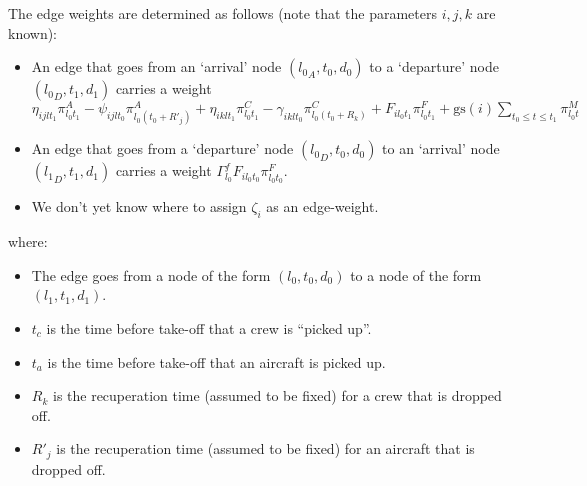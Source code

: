 The edge weights are determined as follows (note that the parameters $i,j,k$ are known):
\begin{itemize}
\item An edge that goes from an `arrival' node $({l_{0}}_A,t_0,d_0)$ to a `departure' node $({l_{0}}_D,t_1,d_1)$ carries a weight $\displaystyle \eta_{ijlt_1}\pi^{A}_{l_0t_1} - \psi_{ijlt_0}\pi^{A}_{l_0(t_0+R'_j)} + \eta_{iklt_1}\pi^{C}_{l_0t_1} - \gamma_{iklt_0}\pi^{C}_{l_0(t_0+R_k)} + F_{il_0t_1}\pi^{F}_{l_0t_1} + \textrm{gs}(i)\sum_{t_0 \le t \le t_1} \pi^{M}_{l_0t}$%
\item An edge that goes from a `departure' node $({l_0}_D,t_0,d_0)$ to an `arrival' node $({l_1}_D,t_1,d_1)$ carries a weight $\Gamma^{f}_{l_0}F_{il_0t_0}\pi^{F}_{l_0t_0}$.
\item We don't yet know where to assign $\zeta_i$ as an edge-weight. 
\end{itemize}
\newpage

where:
\begin{itemize}
\item The edge goes from a node of the form $(l_0,t_0,d_0)$ to a node of the form $(l_1,t_1,d_1)$.
\item $t_c$ is the time before take-off that a crew is ``picked up''.
\item $t_a$ is the time before take-off that an aircraft is picked up.
\item $R_k$ is the recuperation time (assumed to be fixed) for a crew that is dropped off.
\item $R'_j$ is the recuperation time (assumed to be fixed) for an aircraft that is dropped off.
\end{itemize}

